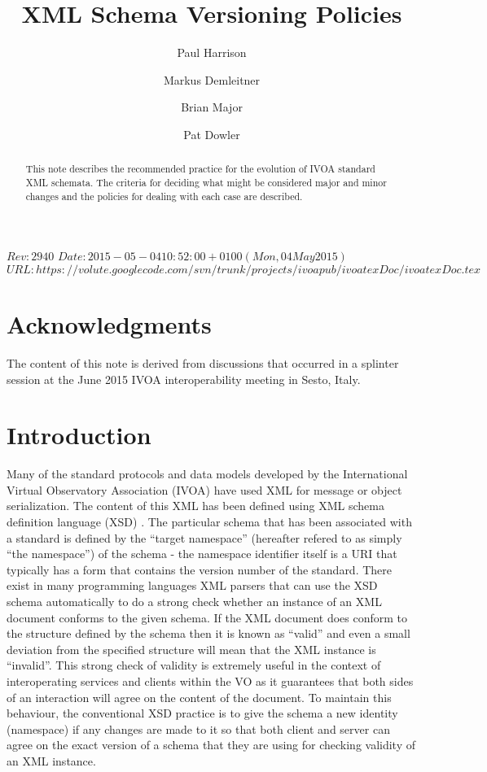 \documentclass[11pt,a4paper]{ivoa}
\title{XML Schema Versioning Policies}
\author[http://www.ivoa.net/cgi-bin/twiki/bin/view/IVOA/PaulHarrison]{Paul Harrison}
\author[http://www.ivoa.net/cgi-bin/twiki/bin/view/IVOA/MarkusDemleitner]{Markus Demleitner}
\author[http://www.ivoa.net/cgi-bin/twiki/bin/view/IVOA/BrianMajor]{Brian Major}
\author[http://www.ivoa.net/cgi-bin/twiki/bin/view/IVOA/PatDowler]{Pat Dowler}
\begin{document}
\SVN$Rev: 2940 $
\SVN$Date: 2015-05-04 10:52:00 +0100 (Mon, 04 May 2015) $
\SVN$URL: https://volute.googlecode.com/svn/trunk/projects/ivoapub/ivoatexDoc/ivoatexDoc.tex $

\begin{abstract}
This note describes the recommended practice for the evolution of IVOA
standard XML schemata.  The criteria for deciding what might be considered major
and minor changes and the policies for dealing with each case are described.
\end{abstract}



\section*{Acknowledgments}

The content of this note is derived from discussions that occurred in a splinter
session at the June 2015 IVOA interoperability meeting in Sesto, Italy.

\section{Introduction}

Many of the standard protocols and data models developed by
the International Virtual Observatory Association (IVOA) have used XML
\citet{std:XML} for message or object serialization. The content of this XML has
been defined using XML schema definition language (XSD) \citet{std:XSD}. The
particular schema that has been associated with a standard 
is defined by the ``target namespace'' (hereafter refered to as simply ``the
namespace'') of the schema - the namespace identifier itself is a URI that
typically has a form that contains the version number of the standard. There
exist in many programming languages XML parsers that can use the XSD schema
automatically to do a strong check whether an instance of an XML
document conforms to the given schema. If the XML document does conform to the
structure defined by the schema then it is known as ``valid'' and even a small
deviation from the specified structure will mean that the XML instance is
``invalid''. This strong check of validity is extremely useful in the context of
interoperating services and clients within the VO as it guarantees that both
sides of an interaction will agree on the content of the document. To maintain
this behaviour, the conventional XSD practice is to give the schema a new
identity (namespace) if any changes are made to it so that both client and
server can agree on the exact version of a schema that they are using for
checking validity of an XML instance.
\end{document}
